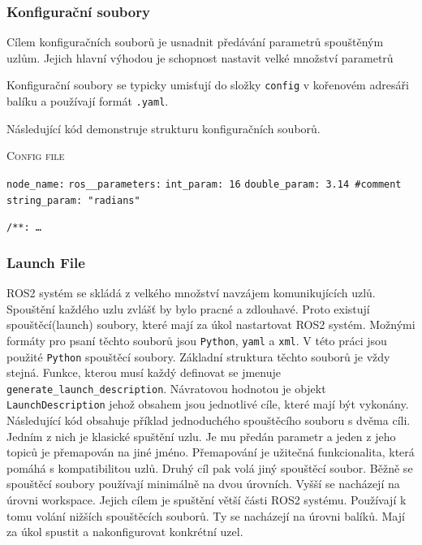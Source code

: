 \subsubsection*{Konfigurační soubory}
Cílem konfiguračních souborů je usnadnit předávání parametrů spouštěným uzlům. Jejich hlavní výhodou je schopnost nastavit velké množství parametrů  %

Konfigurační soubory se typicky umisťují do složky \verb|config| v kořenovém adresáři balíku a používají formát \verb|.yaml|. 

Následující kód demonstruje strukturu konfiguračních souborů.

\begin{algorithm}[h!]
	\label{}
	\caption{\textsc{Config file}}
	
	\DontPrintSemicolon
	\SetAlgoNoLine
	\SetNlSty{}{}{:}
	\SetNlSkip{-1.1em}
	
	\BlankLine \Indp\Indpp
	
	\texttt{node\_name:}\;
	\Indp
	\texttt{ros\_\_parameters:}\;
	\Indp
	\texttt{int\_param: 16}\;
	\texttt{double\_param: 3.14 \#comment}\;
	\texttt{string\_param: "radians"}\;
	
	
	\BlankLine \Indm\Indm
	\texttt{/**: \dots}\;
	
\end{algorithm}

\subsubsection*{Launch File}
ROS2 systém se skládá z velkého množství navzájem komunikujících uzlů. Spouštění každého uzlu zvlášť by bylo pracné a zdlouhavé. Proto existují spouštěcí(launch) soubory, které mají za úkol nastartovat ROS2 systém. Možnými formáty pro psaní těchto souborů jsou \verb|Python|, \verb|yaml| a \verb|xml|. V této práci jsou použité \verb|Python| spouštěcí soubory. Základní struktura těchto souborů je vždy stejná. Funkce, kterou musí každý definovat se jmenuje \verb|generate_launch_description|. Návratovou hodnotou je objekt \verb|LaunchDescription| jehož obsahem jsou jednotlivé cíle, které mají být vykonány. Následující kód obsahuje příklad jednoduchého spouštěcího souboru s dvěma cíli. Jedním z nich je klasické spuštění uzlu. Je mu předán parametr a jeden z jeho topiců je přemapován na jiné jméno. Přemapování je užitečná funkcionalita, která pomáhá s kompatibilitou uzlů. Druhý cíl pak volá jiný spouštěcí soubor. Běžně se spouštěcí soubory používají minimálně na dvou úrovních. Vyšší se nacházejí na úrovni workspace. Jejich cílem je spuštění větší části ROS2 systému. Používají k tomu volání nižších spouštěcích souborů. Ty se nacházejí na úrovni balíků. Mají za úkol spustit a nakonfigurovat konkrétní uzel. \cite{ros2_introduction}


